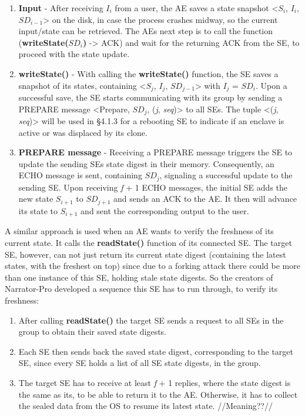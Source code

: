 \begin{enumerate}
    \item \textbf{Input} - After receiving \(I_i\) from a user, the AE saves a state snapshot <\(S_i\), \(I_i\), \(SD_{i-1}\)> on the disk, in case the process crashes midway, so the current input/state can be retrieved. The AEs next step is to call the function (\textbf{writeState(\(SD_i\))} -> ACK) and wait for the returning ACK from the SE, to proceed with the state update.
    \item \textbf{writeState()} - With calling the \textbf{writeState()} function, the SE saves a snapshot of its states, containing <\(S_j\), \(I_j\), \(SD_{j-1}\)> with \(I_j\) = \(SD_{i}\). Upon a successful save, the SE starts communicating with its group by sending a PREPARE message <Prepare, \(SD_{j}\), (\textit{j}, \textit{seq})> to all SEs. The tuple <(\textit{j}, \textit{seq})> will be used in §4.1.3 for a rebooting SE to indicate if an enclave is active or was displaced by its clone.
    \item \textbf{PREPARE message} - Receiving a PREPARE message triggers the SE to update the sending SEs state digest in their memory. Consequently, an ECHO message is sent, containing \(SD_{j}\), signaling a successful update to the sending SE. Upon receiving \textit{f} + 1 ECHO messages, the initial SE adds the new state \(S_{i+1}\) to \(SD_{j+1}\) and sends an ACK to the AE. It then will advance its state to \(S_{i+1}\) and sent the corresponding output to the user.
\end{enumerate}

A similar approach is used when an AE wants to verify the freshness of its current state. It calls the \textbf{readState()} function of its connected SE. The target SE, however, can not just return its current state digest (containing the latest states, with the freshest on top)
since due to a forking attack there could be more than one instance of this SE, holding stale state digests. So the creators of Narrator-Pro developed a sequence this SE has to run through, to verify its freshness:
\begin{enumerate}
    \item After calling \textbf{readState()} the target SE sends a request to all SEs in the group to obtain their saved state digests.
    \item Each SE then sends back the saved state digest, corresponding to the target SE, since every SE holds a list of all SE state digests, in the group.
    \item The target SE has to receive at least \textit{f} + 1 replies, where the state digest is the same as its, to be able to return it to the AE. Otherwise, it has to collect the sealed data from the OS to resume its latest state. //Meaning??//
\end{enumerate}


